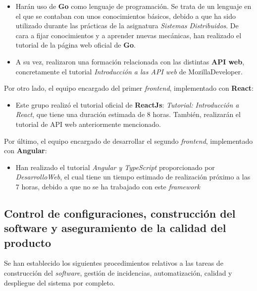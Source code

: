\documentclass[11pt, a4paper, titlepage]{article}
\begin{document}
\begin{itemize}

\item Harán uso de \textbf{Go} como lenguaje de programación. Se trata de un lenguaje en el que se contaban con unos conocimientos básicos, debido a que ha sido utilizado durante las prácticas de la asignatura \textit{Sistemas Distribuidos}. De cara a fijar conocimientos y a aprender nuevas mecánicas, han realizado el tutorial de la página web oficial de \textbf{Go}. 

\item A su vez, realizaron una formación relacionada con las distintas \textbf{API web}, concretamente el tutorial \textit{Introducción a las API web} de MozillaDeveloper\cite{apisweb}.

\end{itemize}

Por otro lado, el equipo encargado del primer \textit{frontend}, implementado con \textbf{React}: 

\begin{itemize}

\item  Este grupo realizó el tutorial oficial de \textbf{ReactJs}: \textit{Tutorial: Introducción a React}\cite{reactjs}, que tiene una duración estimada de 8 horas. También, realizarán el tutorial de API web anteriormente mencionado\cite{apisweb}.

\end{itemize}

Por último, el equipo encargado de desarrollar el segundo \textit{frontend}, implementado con \textbf{Angular}: 

\begin{itemize}

\item Han realizado el tutorial \textit{Angular y TypeScript}\cite{angular} proporcionado por \textit{DesarrolloWeb}, el cual tiene un tiempo estimado de realización próximo a las 7 horas, debido a que no se ha trabajado con este \textit{framework}

\end{itemize}


\subsection{Control de configuraciones, construcción del software y aseguramiento de la calidad del producto}

Se han establecido los siguientes procedimientos relativos a las tareas de construcción del \textit{software}, gestión de incidencias, automatización, calidad y despliegue del sistema por completo.
\end{document}
